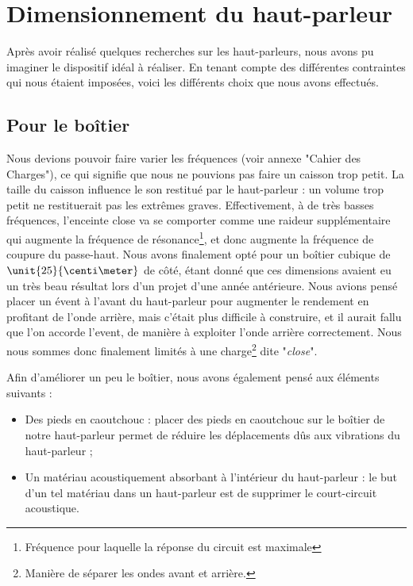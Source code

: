 

\section{Dimensionnement du haut-parleur}
Après avoir réalisé quelques recherches sur les haut-parleurs, nous avons pu imaginer le dispositif idéal 
à réaliser. En tenant compte des différentes contraintes qui nous étaient imposées, voici les différents 
choix que nous avons effectués.

\subsection{Pour le boîtier}
Nous devions pouvoir faire varier les fréquences (voir annexe "Cahier des Charges"), ce qui signifie que nous ne 
pouvions pas faire un caisson trop petit. La taille du caisson influence le son restitué par le haut-parleur :
un volume trop petit ne restituerait pas les extrêmes graves. Effectivement, à de très basses 
fréquences, l'enceinte close va se comporter comme une raideur supplémentaire qui augmente la fréquence de
résonance\footnote{Fréquence pour laquelle la réponse du circuit est maximale}, et donc augmente la 
fréquence de coupure du passe-haut\cite{volume}. Nous avons finalement opté pour un boîtier cubique de 
$\unit{25}{\centi\meter}$ de côté, étant donné que ces dimensions avaient eu un très beau résultat lors 
d'un projet d'une année antérieure. Nous avions pensé placer un évent à l'avant du haut-parleur 
pour augmenter le rendement en profitant de l'onde arrière, mais c'était plus difficile à construire, et 
il aurait fallu que l'on accorde l'event, de manière à exploiter l'onde arrière correctement. Nous nous 
sommes donc finalement limités à une charge\footnote{Manière de séparer les ondes avant et arrière.} dite "\textit{close}"\cite{close}.  

Afin d'améliorer un peu le boîtier, nous avons également pensé aux éléments suivants :

\begin{itemize}
	\item	Des pieds en caoutchouc : placer des pieds en caoutchouc sur le boîtier de notre haut-parleur
				permet de réduire les déplacements dûs aux vibrations du haut-parleur ;
	\item	Un matériau acoustiquement absorbant à l'intérieur du haut-parleur : le but d'un tel matériau
				dans un haut-parleur est de supprimer le court-circuit acoustique\cite{absorber}.
\end{itemize}

